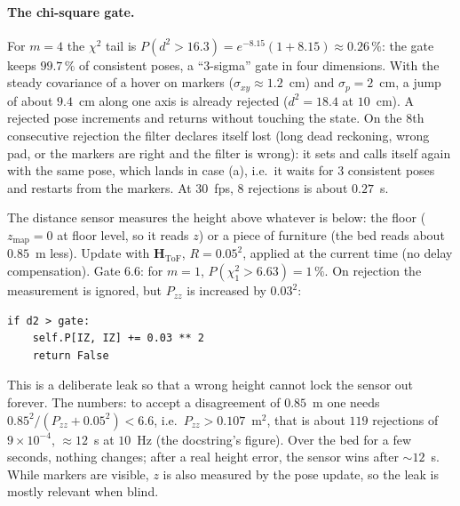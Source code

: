 \paragraph{The chi-square gate.} For $m=4$ the $\chi^2$ tail is $P(d^2>16.3) = e^{-8.15}(1+8.15) \approx 0.26\,\%$: the
gate keeps $99.7\,\%$ of consistent poses, a ``3-sigma'' gate in four dimensions. With the steady covariance of a hover
on markers ($\sigma_{xy}\approx1.2$~cm) and $\sigma_p=2$~cm, a jump of about $9.4$~cm along one axis is already rejected
($d^2=18.4$ at $10$~cm). A rejected pose increments  and returns  without touching the
state. On the 8th consecutive rejection the filter declares itself lost (long dead reckoning, wrong pad, or the markers
are right and the filter is wrong): it sets  and calls itself again with the same pose, which
lands in case (a), i.e.\ it waits for 3 consistent poses and restarts from the markers. At $30$~fps, 8 rejections is
about $0.27$~s.

The distance sensor measures the height above whatever is below: the floor ($z_{\text{map}}=0$ at floor level, so it reads
$z$) or a piece of furniture (the bed reads about $0.85$~m less). Update with $\mathbf H_{\text{ToF}}$, $R=0.05^2$, applied
at the current time (no delay compensation). Gate $6.6$: for $m=1$, $P(\chi^2_1>6.63)=1\,\%$. On rejection the
measurement is ignored, but $P_{zz}$ is increased by $0.03^2$:
\begin{lstlisting}
if d2 > gate:
    self.P[IZ, IZ] += 0.03 ** 2
    return False
\end{lstlisting}
This is a deliberate leak so that a wrong height cannot lock the sensor out forever. The numbers: to accept a disagreement
of $0.85$~m one needs $0.85^2/(P_{zz}+0.05^2) < 6.6$, i.e.\ $P_{zz} > 0.107$~m$^2$, that is about $119$ rejections of
$9\times10^{-4}$, $\approx 12$~s at $10$~Hz (the docstring's figure). Over the bed for a few seconds, nothing changes;
after a real height error, the sensor wins after $\sim12$~s. While markers are visible, $z$ is also measured by the pose
update, so the leak is mostly relevant when blind.

